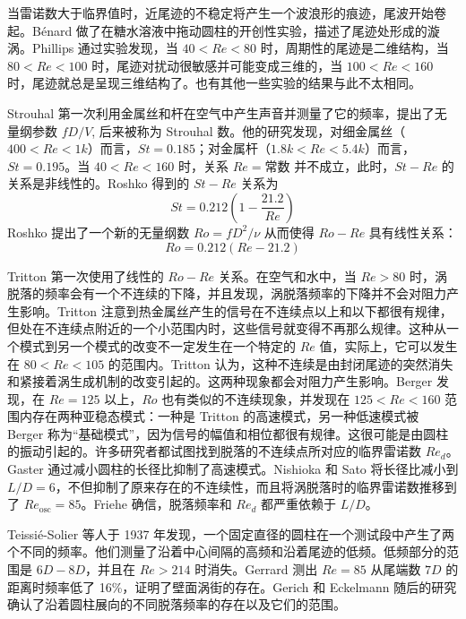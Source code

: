 当雷诺数大于临界值时，近尾迹的不稳定将产生一个波浪形的痕迹，尾波开始卷起。Bénard \cite{Benard1908a,Benard1908b,Benard1913a,Benard1913b} 做了在糖水溶液中拖动圆柱的开创性实验，描述了尾迹处形成的漩涡。Phillips \cite{Phillips1956} 通过实验发现，当 $40<Re<80$ 时，周期性的尾迹是二维结构，当 $80<Re<100$ 时，尾迹对扰动很敏感并可能变成三维的，当 $100<Re<160$ 时，尾迹就总是呈现三维结构了。也有其他一些实验的结果与此不太相同。


Strouhal \cite{Strouhal1878} 第一次利用金属丝和杆在空气中产生声音并测量了它的频率，提出了无量纲参数 $fD/V$, 后来被称为 Strouhal 数。他的研究发现，对细金属丝（$400<Re<1k$）而言，$St=0.185$；对金属杆（$1.8k<Re<5.4k$）而言，$St=0.195$。当 $40<Re<160$ 时，关系 $Re=\text{常数}$ 并不成立，此时，$St-Re$ 的关系是非线性的。Roshko \cite{Roshko1953} 得到的 $St-Re$ 关系为
\begin{equation}
	St = 0.212 (1-\frac{21.2}{Re})
\end{equation}
Roshko \cite{Roshko1953} 提出了一个新的无量纲数 $Ro=fD^2/\nu$ 从而使得 $Ro-Re$ 具有线性关系：
\begin{equation}
	Ro = 0.212 (Re - 21.2)
\end{equation}

Tritton \cite{Tritton1959} 第一次使用了线性的 $Ro-Re$ 关系。在空气和水中，当 $Re>80$ 时，涡脱落的频率会有一个不连续的下降，并且发现，涡脱落频率的下降并不会对阻力产生影响。Tritton 注意到热金属丝产生的信号在不连续点以上和以下都很有规律，但处在不连续点附近的一个小范围内时，这些信号就变得不再那么规律。这种从一个模式到另一个模式的改变不一定发生在一个特定的 $Re$ 值，实际上，它可以发生在 $80<Re<105$ 的范围内。Tritton 认为，这种不连续是由封闭尾迹的突然消失和紧接着涡生成机制的改变引起的。这两种现象都会对阻力产生影响。Berger \cite{Berger1964} 发现，在 $Re=125$ 以上，$Ro$ 也有类似的不连续现象，并发现在 $125<Re<160$ 范围内存在两种亚稳态模式：一种是 Tritton 的高速模式，另一种低速模式被 Berger 称为“基础模式”，因为信号的幅值和相位都很有规律。这很可能是由圆柱的振动引起的。许多研究者都试图找到脱落的不连续点所对应的临界雷诺数 $Re_d$。Gaster \cite{Gaster1971} 通过减小圆柱的长径比抑制了高速模式。Nishioka 和 Sato \cite{Nishioka1974} 将长径比减小到 $L/D=6$，不但抑制了原来存在的不连续性，而且将涡脱落时的临界雷诺数推移到了 $Re_\text{osc}=85$。Friehe \cite{Friehe1980} 确信，脱落频率和 $Re_d$ 都严重依赖于 $L/D$。

Teissié-Solier 等人于 1937 年发现，一个固定直径的圆柱在一个测试段中产生了两个不同的频率。他们测量了沿着中心间隔的高频和沿着尾迹的低频。低频部分的范围是 $6D-8D$，并且在 $Re>214$ 时消失。Gerrard \cite{Gerrard1966} 测出 $Re=85$ 从尾端数 $7D$ 的距离时频率低了 16\%，证明了壁面涡街的存在。Gerich 和 Eckelmann \cite{Gerich1982} 随后的研究确认了沿着圆柱展向的不同脱落频率的存在以及它们的范围。%

